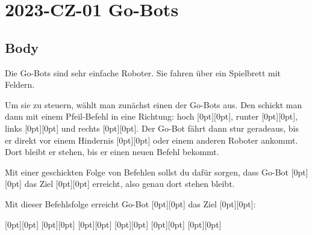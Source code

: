 \documentclass[a4paper,11pt]{report}
\newcommand{\taskGraphicsFolder}{..}
\begin{document}
\section*{\centering{} 2023-CZ-01 Go-Bots}


\subsection*{Body}

Die Go-Bots sind sehr einfache Roboter. Sie fahren über ein Spielbrett mit Feldern.

{\centering%
\par}

Um sie zu steuern, wählt man zunächst einen der Go-Bots aus.
Den schickt man dann mit einem Pfeil-Befehl in eine Richtung:
hoch \raisebox{-0.5ex}[0pt][0pt]{}, runter \raisebox{-0.5ex}[0pt][0pt]{}, links \raisebox{-0.5ex}[0pt][0pt]{} und rechts \raisebox{-0.5ex}[0pt][0pt]{}.
Der Go-Bot fährt dann stur geradeaus, bis er direkt vor einem Hindernis \raisebox{-0.5ex}[0pt][0pt]{} oder einem anderen Roboter ankommt.
Dort bleibt er stehen, bis er einen neuen Befehl bekommt.

Mit einer geschickten Folge von Befehlen sollst du dafür sorgen, dass Go-Bot \raisebox{-0.5ex}[0pt][0pt]{} das Ziel \raisebox{-0.5ex}[0pt][0pt]{} erreicht, also genau dort stehen bleibt.

Mit dieser Befehlsfolge erreicht Go-Bot \raisebox{-0.5ex}[0pt][0pt]{} das Ziel \raisebox{-0.5ex}[0pt][0pt]{}:

{\centering%
\raisebox{-0.5ex}[0pt][0pt]{} \raisebox{-0.5ex}[0pt][0pt]{}   \raisebox{-0.5ex}[0pt][0pt]{} \raisebox{-0.5ex}[0pt][0pt]{}   \raisebox{-0.5ex}[0pt][0pt]{} \raisebox{-0.5ex}[0pt][0pt]{}

{\centering%
\par}\par}
\end{document}
